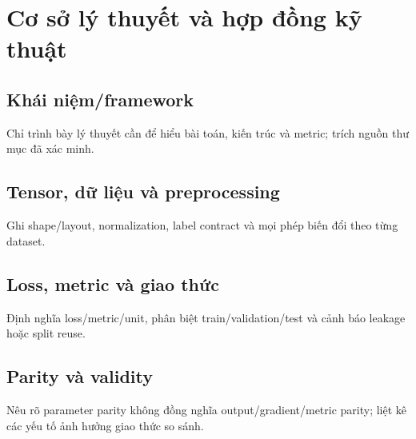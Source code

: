 \chapter{Cơ sở lý thuyết và hợp đồng kỹ thuật}
\section{Khái niệm/framework}
Chỉ trình bày lý thuyết cần để hiểu bài toán, kiến trúc và metric; trích nguồn thư mục đã xác minh.
\section{Tensor, dữ liệu và preprocessing}
Ghi shape/layout, normalization, label contract và mọi phép biến đổi theo từng dataset.
\section{Loss, metric và giao thức}
Định nghĩa loss/metric/unit, phân biệt train/validation/test và cảnh báo leakage hoặc split reuse.
\section{Parity và validity}
Nêu rõ parameter parity không đồng nghĩa output/gradient/metric parity; liệt kê các yếu tố ảnh hưởng giao thức so sánh.